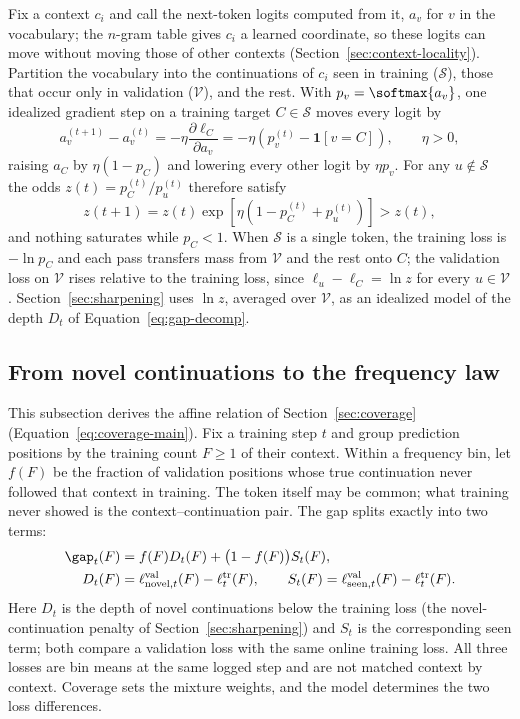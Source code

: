Fix a context $c_i$ and call the next-token logits computed from it, $a_v$ for $v$ in the vocabulary; the $n$-gram table gives $c_i$ a learned coordinate, so these logits can move without moving those of other contexts (Section~\ref{sec:context-locality}). Partition the vocabulary into the continuations of $c_i$ seen in training ($\mathcal{S}$), those that occur only in validation ($\mathcal{V}$), and the rest. With $p_v=\softmax{a_v}$, one idealized gradient step on a training target $C\in\mathcal{S}$ moves every logit by
\begin{equation}
a_v^{(t+1)}-a_v^{(t)}=-\eta\frac{\partial\ell_C}{\partial a_v}=-\eta\left(p_v^{(t)}-\mathbf{1}[v=C]\right),\qquad \eta>0,
\label{eq:av}
\end{equation}
raising $a_C$ by $\eta(1-p_C)$ and lowering every other logit by $\eta p_v$. For any $u\notin\mathcal{S}$ the odds $z(t)=p_C^{(t)}/p_u^{(t)}$ therefore satisfy
\begin{equation}
z(t+1)=z(t)\exp\!\left[\eta\left(1-p_C^{(t)}+p_u^{(t)}\right)\right]>z(t),
\label{eq:zt}
\end{equation}
and nothing saturates while $p_C<1$. When $\mathcal{S}$ is a single token, the training loss is $-\ln p_C$ and each pass transfers mass from $\mathcal{V}$ and the rest onto $C$; the validation loss on $\mathcal{V}$ rises relative to the training loss, since $\ell_u-\ell_C=\ln z$ for every $u\in\mathcal{V}$. Section~\ref{sec:sharpening} uses $\ln z$, averaged over $\mathcal{V}$, as an idealized model of the depth $D_t$ of Equation~\eqref{eq:gap-decomp}.

\subsection{From novel continuations to the frequency law}
\label{app:coverage}

This subsection derives the affine relation of Section~\ref{sec:coverage} (Equation~\eqref{eq:coverage-main}). Fix a training step $t$ and group prediction positions by the training count $F\ge1$ of their context. Within a frequency bin, let $f(F)$ be the fraction of validation positions whose true continuation never followed that context in training. The token itself may be common; what training never showed is the context--continuation pair. The gap splits exactly into two terms:
\begin{equation}
\begin{aligned}
\gap_t(F)&=f(F)D_t(F)+\big(1-f(F)\big)S_t(F),\\
D_t(F)&=\ell^{\mathrm{val}}_{\mathrm{novel},t}(F)-\ell^{\mathrm{tr}}_t(F),\qquad
S_t(F)=\ell^{\mathrm{val}}_{\mathrm{seen},t}(F)-\ell^{\mathrm{tr}}_t(F).
\end{aligned}
\label{eq:gap-decomp}
\end{equation}
Here $D_t$ is the depth of novel continuations below the training loss (the novel-continuation penalty of Section~\ref{sec:sharpening}) and $S_t$ is the corresponding seen term; both compare a validation loss with the same online training loss. All three losses are bin means at the same logged step and are not matched context by context. Coverage sets the mixture weights, and the model determines the two loss differences.

